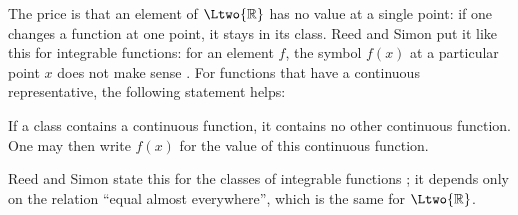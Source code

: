 \begin{fundament}
  The price is that an element of $\Ltwo{\mathbb{R}}$ has no value at a single point: if one
  changes a function at one point, it stays in its class. Reed and Simon put it like this for
  integrable functions: for an element $f$, the symbol $f(x)$ at a particular point $x$ does
  not make sense . For functions that have a continuous
  representative, the following statement helps:

  \begin{proposition}\label{c03.prop.stetig}
    If a class contains a continuous function, it contains no other continuous function. One
    may then write $f(x)$ for the value of this continuous function.
  \end{proposition}

  Reed and Simon state this for the classes of integrable functions
  ; it depends only on the relation “equal almost everywhere”,
  which is the same for $\Ltwo{\mathbb{R}}$.
\end{fundament}

